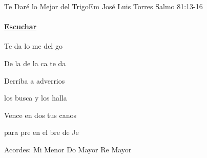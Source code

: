 \documentclass[12pt, spanish]{book}
\begin{document}
    \begin{song}{Te Daré lo Mejor del Trigo}{Em}
    {} %
    {José Luis Torres}
    {Salmo 81:13-16} %
    {}
        \ifChordBk
        \paragraph{\mbox{}\hfill\protect\href{https://open.spotify.com/intl-es/track/3jxxDKltoHzvrePs9eA1tU}{Escuchar}\mbox{}\hfill}
        \fi

        \begin{SBOpGroup}
            Te da lo me del go

            De la  de la ca te da
        \end{SBOpGroup}

        \begin{SBChorus}
            Derriba a  adverrios

            los busca y  los halla
        \end{SBChorus}

        \begin{SBOpGroup}
            Vence en dos tus canos

            para pre en el bre de Je
        \end{SBOpGroup}

        \ifChordBk
        \begin{SBOpGroup}
            Acordes:
            \upchord{\Em}\qquad Mi Menor \hfill
            \upchord{\C}\qquad Do Mayor \hfill\null\break
            \upchord{\D}\qquad Re Mayor \hfill
        \end{SBOpGroup}
        \fi
    \end{song}
\end{document}
